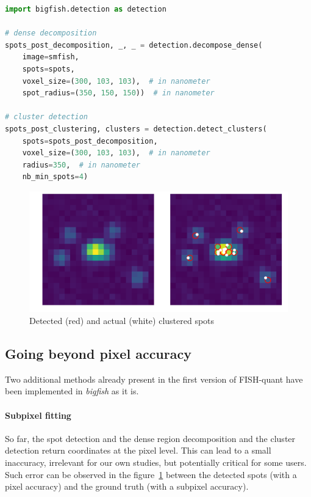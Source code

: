 \begin{minipage}{0.9\textwidth}
\begin{lstlisting}[language=Python]
import bigfish.detection as detection

# dense decomposition
spots_post_decomposition, _, _ = detection.decompose_dense(
    image=smfish,
    spots=spots,
    voxel_size=(300, 103, 103),  # in nanometer
    spot_radius=(350, 150, 150))  # in nanometer

# cluster detection
spots_post_clustering, clusters = detection.detect_clusters(
    spots=spots_post_decomposition,
    voxel_size=(300, 103, 103),  # in nanometer
    radius=350,  # in nanometer
    nb_min_spots=4)
\end{lstlisting}
\end{minipage}

\begin{figure}[h]
    \centering
    \includegraphics[width=1\textwidth]{figures/chapter2/plot_dense_decomposition}
    \caption{Detected (red) and actual (white) clustered spots}
    \label{fig:dense_decomposition}
\end{figure}

\subsection{Going beyond pixel accuracy} \label{subsec:subpixel}

Two additional methods already present in the first version of FISH-quant\cite{mueller_fish-quant_2013} have been implemented in \emph{bigfish} as it is.

\paragraph{Subpixel fitting}

So far, the spot detection and the dense region decomposition and the cluster detection return coordinates at the pixel level.
This can lead to a small inaccuracy, irrelevant for our own studies, but potentially critical for some users.
Such error can be observed in the figure~\ref{fig:dense_decomposition} between the detected spots (with a pixel accuracy) and the ground truth (with a subpixel accuracy).

